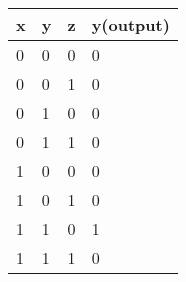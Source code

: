 \documentclass{article}
\begin{document}
\begin{enumerate}
\begin{table}[!h]
        \centering
        
\begin{tabular}{|p{}|p{}|p{}|p{}|}
\hline 
 x & y & z & y(output) \\
\hline 
 0 & 0 & 0 & 0 \\
\hline 
 0 & 0 & 1 & 0 \\
\hline 
 0 & 1 & 0 & 0 \\
\hline 
 0 & 1 & 1 & 0 \\
\hline 
 1 & 0 & 0 & 0 \\
\hline 
 1 & 0 & 1 & 0 \\
\hline 
 1 & 1 & 0 & 1 \\
\hline 
 1 & 1 & 1 & 0 \\
 \hline
\end{tabular}
        

\end{table}
\end{enumerate}
\end{document}
